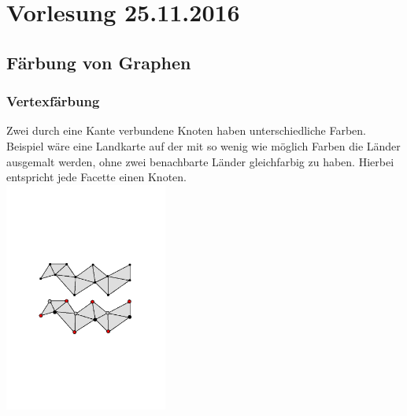 \section{Vorlesung 25.11.2016}
\subsection{Färbung von Graphen}
\subsubsection{Vertexfärbung}
Zwei durch eine Kante verbundene Knoten haben unterschiedliche Farben.\\
Beispiel wäre eine Landkarte auf der mit so wenig wie möglich Farben die Länder ausgemalt werden, ohne zwei benachbarte Länder gleichfarbig zu haben. Hierbei entspricht jede Facette einen Knoten.\\
\includegraphics[width=0.4\textwidth]{lectures/161118/pix/Vertexfaerbung}

